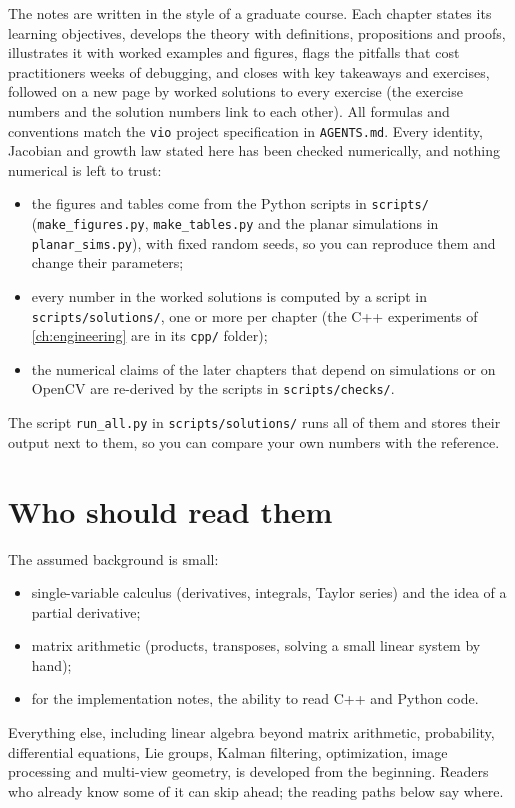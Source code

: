The notes are written in the style of a graduate course. Each chapter states its learning
objectives, develops the theory with definitions, propositions and proofs, illustrates it with
worked examples and figures, flags the pitfalls that cost practitioners weeks of debugging, and
closes with key takeaways and exercises, followed on a new page by worked solutions to every exercise (the exercise numbers and the
solution numbers link to each other). All formulas and conventions match the \texttt{vio}
project specification in \texttt{AGENTS.md}. Every identity, Jacobian and growth law stated here has
been checked numerically, and nothing numerical is left to trust:
\begin{itemize}
  \item the figures and tables come from the Python scripts in \texttt{scripts/} (\texttt{make\_figures.py}, \texttt{make\_tables.py} and the planar
        simulations in \texttt{planar\_sims.py}), with fixed random seeds, so you can reproduce them and change their parameters;
  \item every number in the worked solutions is computed by a script in \texttt{scripts/solutions/}, one or more per chapter (the C++ experiments of
        \cref{ch:engineering} are in its \texttt{cpp/} folder);
  \item the numerical claims of the later chapters that depend on simulations or on OpenCV are re-derived by the scripts in \texttt{scripts/checks/}.
\end{itemize}
The script \texttt{run\_all.py} in \texttt{scripts/solutions/} runs all of them and stores their output next to them, so you can compare your own
numbers with the reference.

\section*{Who should read them}

The assumed background is small:
\begin{itemize}
  \item single-variable calculus (derivatives, integrals, Taylor series) and the idea of a partial derivative;
  \item matrix arithmetic (products, transposes, solving a small linear system by hand);
  \item for the implementation notes, the ability to read C++ and Python code.
\end{itemize}
Everything else, including linear algebra beyond matrix arithmetic, probability, differential equations, Lie groups,
Kalman filtering, optimization, image processing and multi-view geometry, is developed from the beginning. Readers
who already know some of it can skip ahead; the reading paths below say where.

